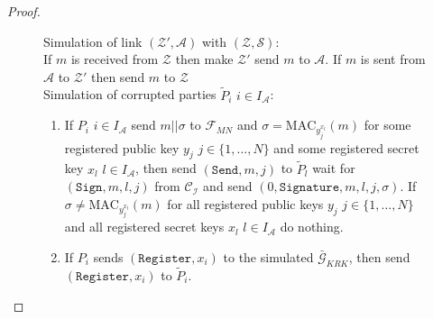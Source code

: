 \documentclass{acm_proc_article-sp}
\begin{document}
\begin{proof}
\begin{figure}
{\begin{minipage}[t]{1\columnwidth}
Simulation of link $(\mathcal{Z}', \mathcal{A})$ with $(\mathcal{Z}, \mathcal{S})$:\\
If $m$ is received from $\mathcal{Z}$ then make $\mathcal{Z}'$ send $m$ to $\mathcal{A}$.
If $m$ is sent from $\mathcal{A}$ to $\mathcal{Z}'$ then send $m$ to $\mathcal{Z}$\\

Simulation of corrupted parties $\tilde{P}_i$ $i \in I_\mathcal{A}$:

\begin{enumerate}
\item If $P_i$ $i \in I_\mathcal{A}$ send $m||\sigma$ to $\mathcal{F}_{MN}$ and
      $\sigma = \textrm{MAC}_{y_j^{x_l}}(m)$ for some registered public key $y_j$ $j \in \{1, \ldots, N\}$
      and some registered secret key $x_l$ $l \in I_\mathcal{A}$, then send
      $(\mathtt{Send}, m, j)$ to $\tilde{P}_l$ wait for $(\mathtt{Sign}, m, l, j)$ from $\mathcal{C_I}$ and
      send $(0, \mathtt{Signature}, m, l, j, \sigma)$. If $\sigma \neq \textrm{MAC}_{y_j^{x_l}}(m)$ for all
      registered public keys $y_j$ $j \in \{1, \ldots, N\}$ and all registered secret keys $x_l$ $l \in I_\mathcal{A}$
      do nothing.
\item If $P_i$ sends $(\mathtt{Register}, x_i)$ to the simulated $\bar{\mathcal{G}}_{KRK}$, then send
      $(\mathtt{Register}, x_i)$ to $\tilde{P}_i$.
\end{enumerate}


\end{minipage}}
\end{figure}
\end{proof}
\end{document}
